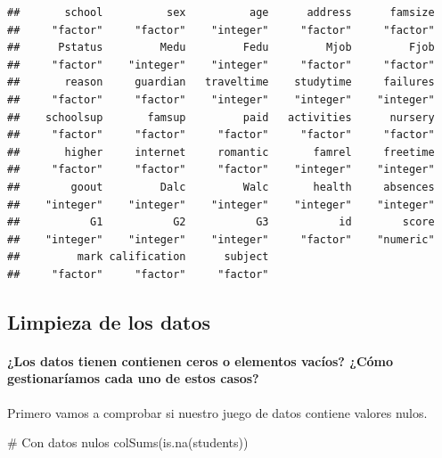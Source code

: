 \documentclass[]{article}
\newenvironment{Shaded}{\begin{snugshade}}{\end{snugshade}}
\newcommand{\CommentTok}[1]{\textcolor[rgb]{0.50,0.62,0.50}{#1}}
\newcommand{\KeywordTok}[1]{\textcolor[rgb]{0.94,0.87,0.69}{#1}}
\newcommand{\NormalTok}[1]{\textcolor[rgb]{0.80,0.80,0.80}{#1}}
\let\oldparagraph\paragraph
\renewcommand{\paragraph}[1]{\oldparagraph{#1}\mbox{}}
\begin{document}
\begin{verbatim}
##       school          sex          age      address      famsize 
##     "factor"     "factor"    "integer"     "factor"     "factor" 
##      Pstatus         Medu         Fedu         Mjob         Fjob 
##     "factor"    "integer"    "integer"     "factor"     "factor" 
##       reason     guardian   traveltime    studytime     failures 
##     "factor"     "factor"    "integer"    "integer"    "integer" 
##    schoolsup       famsup         paid   activities      nursery 
##     "factor"     "factor"     "factor"     "factor"     "factor" 
##       higher     internet     romantic       famrel     freetime 
##     "factor"     "factor"     "factor"    "integer"    "integer" 
##        goout         Dalc         Walc       health     absences 
##    "integer"    "integer"    "integer"    "integer"    "integer" 
##           G1           G2           G3           id        score 
##    "integer"    "integer"    "integer"     "factor"    "numeric" 
##         mark calification      subject 
##     "factor"     "factor"     "factor"
\end{verbatim}

\hypertarget{limpieza-de-los-datos}{%
\subsection{Limpieza de los datos}\label{limpieza-de-los-datos}}

\hypertarget{los-datos-tienen-contienen-ceros-o-elementos-vacios-como-gestionariamos-cada-uno-de-estos-casos}{%
\paragraph{¿Los datos tienen contienen ceros o elementos vacíos? ¿Cómo
gestionaríamos cada uno de estos
casos?}\label{los-datos-tienen-contienen-ceros-o-elementos-vacios-como-gestionariamos-cada-uno-de-estos-casos}}

Primero vamos a comprobar si nuestro juego de datos contiene valores
nulos.

\begin{Shaded}
\begin{Highlighting}[]
\CommentTok{# Con datos nulos}
\KeywordTok{colSums}\NormalTok{(}\KeywordTok{is.na}\NormalTok{(students))}
\end{Highlighting}
\end{Shaded}
\end{document}
